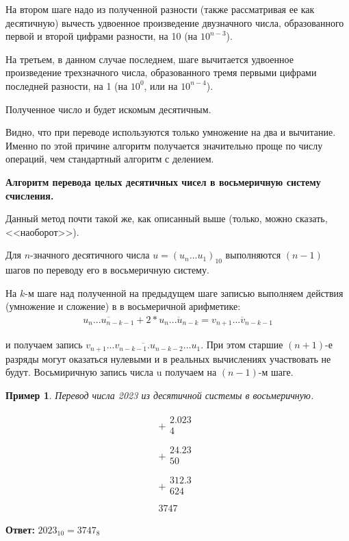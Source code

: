 \documentclass[14pt, russian]{scrartcl}
\newcounter{cExample}
\newtheorem{Example}{Пример}[cExample]
\begin{document}
На втором шаге надо из полученной разности (также рассматривая ее как десятичную) вычесть удвоенное произведение двузначного числа, образованного первой и второй цифрами разности, на 10 (на $10^{n-3}$).

На третьем, в данном случае последнем, шаге вычитается удвоенное произведение трехзначного числа, образованного тремя первыми цифрами последней разности, на 1 (на $10^0$, или на $10^{n-4}$).

Полученное число и будет искомым десятичным.

Видно, что при переводе используются только умножение на два и вычитание. Именно по этой причине алгоритм получается значительно проще по числу операций, чем стандартный алгоритм с делением.

\vspace{1em}
\textbf{Алгоритм перевода целых десятичных чисел в восьмеричную систему счисления.}

Данный метод почти такой же, как описанный выше (только,
можно сказать, <<наоборот>>).

Для $n$-значного десятичного числа $u = (u_n...u_1)_{10}$ выполняются $(n - 1)$ шагов по переводу его в восьмеричную систему.

На $k$-м шаге над полученной на предыдущем шаге записью выполняем действия (умножение и сложение) в в восьмеричной арифметике:
\label{Example:MathFont6} 
\begin{equation*}\label{eq:5}
\begin{aligned}
\overline{u_n ... u_{n-k-1}} + 2 * \overline{u_n ... u_{n-k}} = \overline{v_{n+1} ... v_{n-k-1}}
\end{aligned}
\end{equation*} 

и получаем запись $\overline{v_{n+1} ... v_{n-k-1}.u_{n-k-2} ... u_1}$. При этом старшие $(n + 1)$-е разряды могут оказаться нулевыми и в реальных вычислениях участвовать не будут. Восьмиричную запись числа u получаем на $(n - 1)$-м шаге.

\begin{Example}\label{Example:MathFont7}
Перевод числа 2023 из десятичной системы в восьмеричную. 

$$
\begin{array}{r}
+
\begin{array}{r}
2.023\\
4\quad\quad\\
\end{array} \\
\hline
+
\begin{array}{r}
24.23\\
50\,\,\,\,\\
\end{array} \\
\hline
+
\begin{array}{r}
312.3\\
624\\
\end{array} \\
\hline
3747\,\,\,
\end{array}
$$
\end{Example} 
\textbf{Ответ:} $2023_{10} = 3747_8$ 
\end{document}
